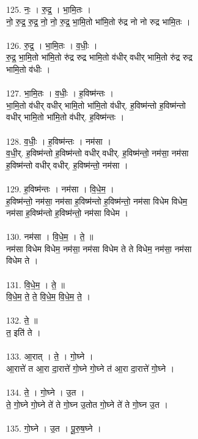 125. नः॒ । रु॒द्र॒ । भा॒मि॒तः ।\\
नो॒ रु॒द्र॒ रु॒द्र॒ नो॒ नो॒ रु॒द्र॒ भा॒मि॒तो भा॑मि॒तो रु॑द्र नो नो रुद्र भामि॒तः ।\\
\\
126. रु॒द्र॒ । भा॒मि॒तः । व॒धीः॒ ।\\
रु॒द्र॒ भा॒मि॒तो भा॑मि॒तो रु॑द्र रुद्र भामि॒तो व॑धीर् वधीर् भामि॒तो रु॑द्र रुद्र\\
भामि॒तो व॑धीः ।\\
\\
127. भा॒मि॒तः । व॒धीः॒ । ह॒विष्म॑न्तः ।\\
भा॒मि॒तो व॑धीर् वधीर् भामि॒तो भा॑मि॒तो व॑धीर्. ह॒विष्म॑न्तो ह॒विष्म॑न्तो\\
वधीर् भामि॒तो भा॑मि॒तो व॑धीर्. ह॒विष्म॑न्तः ।\\
\\
128. व॒धीः॒ । ह॒विष्म॑न्तः । नम॑सा ।\\
व॒धी॒र्. ह॒विष्म॑न्तो ह॒विष्म॑न्तो वधीर् वधीर्. ह॒विष्म॑न्तो॒ नम॑सा॒ नम॑सा\\
ह॒विष्म॑न्तो वधीर् वधीर्. ह॒विष्म॑न्तो॒ नम॑सा ।\\
\\
129. ह॒विष्म॑न्तः । नम॑सा । वि॒धे॒म॒ ।\\
ह॒विष्म॑न्तो॒ नम॑सा॒ नम॑सा ह॒विष्म॑न्तो ह॒विष्म॑न्तो॒ नम॑सा विधेम विधेम॒\\
नम॑सा ह॒विष्म॑न्तो ह॒विष्म॑न्तो॒ नम॑सा विधेम ।\\
\\
130. नम॑सा । वि॒धे॒म॒ । ते॒ ॥\\
नम॑सा विधेम विधेम॒ नम॑सा॒ नम॑सा विधेम ते ते विधेम॒ नम॑सा॒ नम॑सा\\
विधेम ते ।\\
\\
131. वि॒धे॒म॒ । ते॒ ॥\\
वि॒धे॒म॒ ते॒ ते॒ वि॒धे॒म॒ वि॒धे॒म॒ ते॒ ।\\
\\
132. ते॒ ॥\\
त॒ इति॑ ते ।\\
\\
133. आ॒रात् । ते॒ । गो॒घ्ने ।\\
आ॒रात्ते॑ त आ॒रा दा॒रात्ते॑ गो॒घ्ने गो॒घ्ने त॑ आ॒रा दा॒रात्ते॑ गो॒घ्ने ।\\
\\
134. ते॒ । गो॒घ्ने । उ॒त ।\\
ते॒ गो॒घ्ने गो॒घ्ने ते॑ ते गो॒घ्न उ॒तोत गो॒घ्ने ते॑ ते गो॒घ्न उ॒त ।\\
\\
135. गो॒घ्ने । उ॒त । पू॒रु॒ष॒घ्ने ।\\
